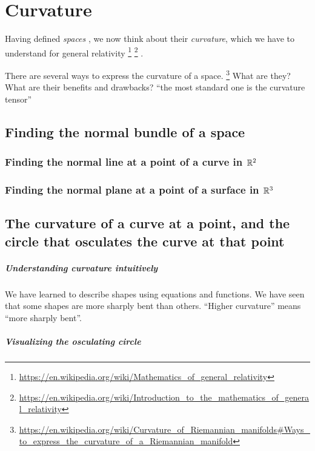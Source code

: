 \chapter{Curvature}

Having defined \emph{spaces} ,
we now think about their \emph{curvature},
which we have to understand for general relativity%
\footnote{\url{https://en.wikipedia.org/wiki/Mathematics_of_general_relativity}}%
\footnote{\url{https://en.wikipedia.org/wiki/Introduction_to_the_mathematics_of_general_relativity}}%
.

There are several ways to express the curvature of a space.%
\footnote{\url{https://en.wikipedia.org/wiki/Curvature_of_Riemannian_manifolds\#Ways_to_express_the_curvature_of_a_Riemannian_manifold}}
What are they?
What are their benefits and drawbacks?
\enquote{the most standard one is the curvature tensor}

\section{Finding the normal bundle of a space}

\subsection{Finding the normal line at a point of a curve in \(\mathbb{R}^2\)}

\subsection{Finding the normal plane at a point of a surface in \(\mathbb{R}^3\)}

\section{The curvature of a curve at a point, and the circle that osculates the curve at that point}

\paragraph{Understanding curvature intuitively}

We have learned to describe shapes using equations and functions.
We have seen that some shapes are more sharply bent than others.
\enquote{Higher curvature} means \enquote{more sharply bent}.

\paragraph{Visualizing the osculating circle}


